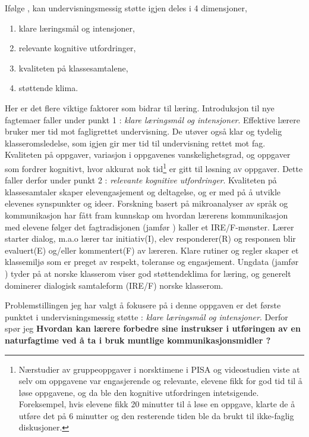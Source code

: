 \documentclass[main.tex]{subfiles}
\begin{document}
Ifølge , kan undervisningsmessig støtte igjen deles i 4 dimensjoner,
\begin{enumerate}
\item klare læringsmål og intensjoner,
\item relevante kognitive utfordringer,
\item kvaliteten på klassesamtalene,
\item støttende klima.
\end{enumerate}
Her er det flere viktige faktorer som bidrar til læring. Introduksjon til nye fagtemaer faller under punkt 1 : 
\emph{klare læringsmål og intensjoner}. Effektive lærere bruker mer tid mot fagligrettet undervisning. 
De utøver også klar og tydelig klasseromsledelse, som igjen gir mer tid til undervisning rettet mot fag. 
Kvaliteten på oppgaver, variasjon i oppgavenes vanskelighetsgrad, og oppgaver som fordrer kognitivt, hvor akkurat 
nok tid\footnote{
Nærstudier av gruppeoppgaver i norsktimene i PISA og videostudien  viste at selv om oppgavene
var engasjerende og relevante, elevene fikk for god tid til å løse oppgavene, og da ble den kognitive utfordringen 
intetsigende. Foreksempel, hvis elevene fikk 20 minutter til å løse en oppgave, klarte de å utføre det på 6 
minutter og den resterende tiden ble da brukt til ikke-faglig diskusjoner.} 
er gitt til løsning av oppgaver. Dette faller derfor under punkt 2 : \emph{relevante kognitive utfordringer}. 
Kvaliteten på klassesamtaler skaper elevengasjement og deltagelse, og er med på å utvikle elevenes synspunkter og ideer. 
Forskning basert på mikroanalyser av språk og kommunikasjon har fått fram kunnskap om hvordan lærerens kommunikasjon
med elevene følger det fagtradisjonen (jamfør ) kaller et IRE/F-mønster. Lærer starter dialog, m.a.o lærer tar 
initiativ(I), elev responderer(R) og responsen blir evaluert(E) og/eller kommentert(F) av læreren.
Klare rutiner og regler skaper et klassemiljø som er preget av respekt, toleranse og engasjement. 
Ungdata (jamfør ) tyder på at norske klasserom viser god støttendeklima for læring, og generelt dominerer 
dialogisk samtaleform (IRE/F) norske klasserom.
\newline

Problemstillingen jeg har valgt å fokusere på i denne oppgaven er det første punktet i undervisningsmessig støtte : 
\emph{klare læringsmål og intensjoner}. Derfor spør jeg 
\newline\newline
\textbf{Hvordan kan lærere forbedre sine instrukser i utføringen av en naturfagtime ved å ta i bruk muntlige kommunikasjonsmidler ?}
\newline
\end{document}
